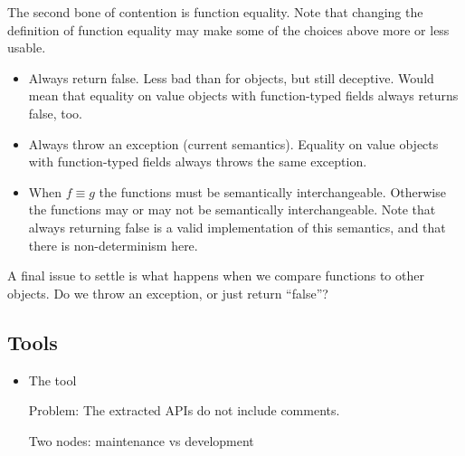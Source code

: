 \begin{itemize}
\begin{itemize}
  \end{itemize}
  The second bone of contention is function equality.  Note that changing the definition of function equality may make some of the choices above more or less usable.
  \begin{itemize}
     \item Always return false.  Less bad than for objects, but still deceptive.  Would mean that equality on value objects with function-typed fields always returns false, too.
     \item Always throw an exception (current semantics).  Equality on value objects with function-typed fields always throws the same exception.
     \item When $f\equiv g$ the functions must be semantically interchangeable.  Otherwise the functions may or may not be semantically interchangeable.  Note that always returning false is a valid implementation of this semantics, and that there is non-determinism here.
  \end{itemize}
A final issue to settle is what happens when we compare functions to other objects.  Do we throw an exception, or just return ``false''?

\end{itemize}

\subsection{Tools}
\begin{itemize}
\item The  tool

Problem: The extracted APIs do not include comments.

Two nodes: maintenance vs development

\end{itemize}
